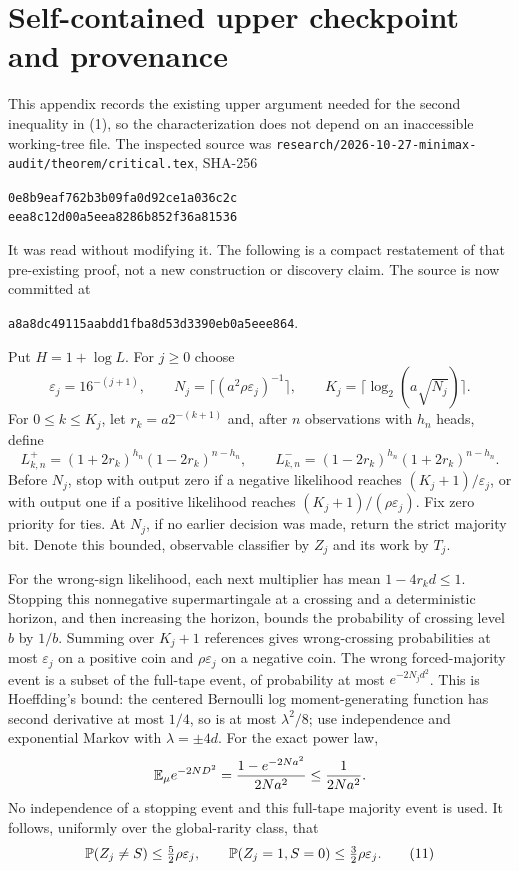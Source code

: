 \section{Self-contained upper checkpoint and provenance}
This appendix records the existing upper argument needed for the second
inequality in (1), so the characterization does not depend on an inaccessible
working-tree file. The inspected source was
\texttt{research/\allowbreak{}2026-10-27-minimax-audit/\allowbreak{}theorem/\allowbreak{}critical.tex}, SHA-256
\begin{center}\small\texttt{0e8b9eaf762b3b09fa0d92ce1a036c2c}\\\texttt{eea8c12d00a5eea8286b852f36a81536}\end{center}
It was read without modifying it. The following is a compact restatement of
that pre-existing proof, not a new construction or discovery claim.
The source is now committed at
\par\noindent\texttt{a8a8dc49115aabdd1fba8d53d3390eb0a5eee864}.

Put $H=1+\log L$. For $j\ge0$ choose
\[
 \varepsilon_j=16^{-(j+1)},\qquad
 N_j=\lceil(a^2\rho\varepsilon_j)^{-1}\rceil,\qquad
 K_j=\lceil\log_2(a\sqrt{N_j})\rceil.
\]
For $0\le k\le K_j$, let $r_k=a2^{-(k+1)}$ and, after $n$ observations
with $h_n$ heads, define
\[
 L^+_{k,n}=(1+2r_k)^{h_n}(1-2r_k)^{n-h_n},\qquad
 L^-_{k,n}=(1-2r_k)^{h_n}(1+2r_k)^{n-h_n}.
\]
Before $N_j$, stop with output zero if a negative likelihood reaches
$(K_j+1)/\varepsilon_j$, or with output one if a positive likelihood reaches
$(K_j+1)/(\rho\varepsilon_j)$. Fix zero priority for ties. At $N_j$, if no
earlier decision was made, return the strict majority bit. Denote this bounded,
observable classifier by $Z_j$ and its work by $T_j$.

For the wrong-sign likelihood, each next multiplier has mean $1-4r_kd\le1$.
Stopping this nonnegative supermartingale at a crossing and a deterministic
horizon, and then increasing the horizon, bounds the probability of crossing
level $b$ by $1/b$. Summing over $K_j+1$ references gives wrong-crossing
probabilities at most $\varepsilon_j$ on a positive coin and
$\rho\varepsilon_j$ on a negative coin. The wrong forced-majority event is
a subset of the full-tape event, of probability at most $e^{-2N_jd^2}$.
This is Hoeffding's bound: the centered Bernoulli log moment-generating
function has second derivative at most $1/4$, so is at most $\lambda^2/8$;
use independence and exponential Markov with $\lambda=\pm4d$.
For the exact power law,
\[
 \mathbb E_\mu e^{-2ND^2}=\frac{1-e^{-2Na^2}}{2Na^2}\le\frac1{2Na^2}.
\]
No independence of a stopping event and this full-tape majority event is used.
It follows, uniformly over the global-rarity class, that
\[
 \mathbb P(Z_j\ne S)\le\tfrac52\rho\varepsilon_j,
 \qquad \mathbb P(Z_j=1,S=0)\le\tfrac32\rho\varepsilon_j.       \tag{11}
\]

